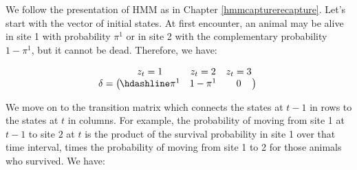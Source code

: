 \documentclass[
  12pt,
]{krantz}
\begin{document}
We follow the presentation of HMM as in Chapter \ref{hmmcapturerecapture}. Let's start with the vector of initial states. At first encounter, an animal may be alive in site 1 with probability \(\pi^1\) or in site 2 with the complementary probability \(1 - \pi^{1}\), but it cannot be dead. Therefore, we have:

\[\begin{matrix}
& \\
\mathbf{\delta} =
    \left ( \vphantom{ \begin{matrix} 12 \end{matrix} } \right .
\end{matrix}
\hspace{-1.2em}
\begin{matrix}
    z_t=1 & z_t=2 & z_t=3 \\ \hdashline
\pi^1 & 1 - \pi^{1} & 0\\
\end{matrix}
\hspace{-0.2em}
\begin{matrix}
& \\
\left . \vphantom{ \begin{matrix} 12 \end{matrix} } \right )
    \begin{matrix}
    \end{matrix}
\end{matrix}\]

We move on to the transition matrix which connects the states at \(t-1\) in rows to the states at \(t\) in columns. For example, the probability of moving from site 1 at \(t-1\) to site \(2\) at \(t\) is the product of the survival probability in site 1 over that time interval, times the probability of moving from site 1 to 2 for those animals who survived. We have:
\end{document}
